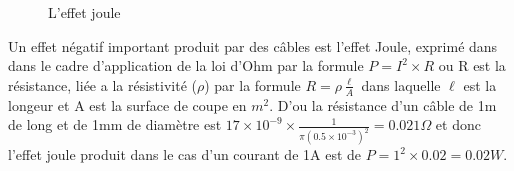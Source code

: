 \documentclass[12pt]{report}
\begin{document}
\begin{figure}
  \begin{center}
    \setlength\fboxsep{0pt}
    \setlength\fboxrule{0.5pt}
  \end{center}
  \caption{L'effet joule}
\end{figure}Un effet négatif important produit par des câbles est l'effet Joule, exprimé dans dans le cadre d'application de la loi d'Ohm par la formule \( P=I^{2} \times R\)\cite{wiki2} ou R est la résistance, liée a la résistivité (\(\rho\)) par la formule \( R= \rho \frac{\ell}{A} \)\cite{wiki3} dans laquelle \(\ell\) est la longeur et A est la surface de coupe en \(m^2\).
D'ou la résistance d'un câble de 1m de long et de 1mm de diamètre est \(17 \times 10^{-9} \times \frac{1}{\pi (0.5 \times 10^{-3})^{2}} = 0.021 \Omega \) et donc l'effet joule produit dans le cas d'un courant de 1A est de \( P=1^{2} \times 0.02 = 0.02 W\).
\end{document}
